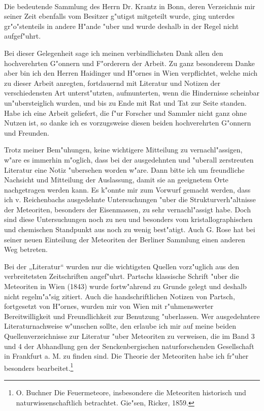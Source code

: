 \documentclass[a4paper, 11pt, oneside]{article}
\begin{document}
\paragraph{}
Die bedeutende Sammlung des Herrn Dr. Krantz in Bonn, deren Verzeichnis mir seiner Zeit ebenfalls vom Besitzer g"utigst mitgeteilt wurde, ging unterdes gr"o"stenteils in andere H"ande "uber und wurde deshalb in der Regel nicht aufgef"uhrt.

Bei dieser Gelegenheit sage ich meinen verbindlichsten Dank allen den hochverehrten G"onnern und F"orderern der Arbeit. Zu ganz besonderem Danke aber bin ich den Herren Haidinger und H"ornes in Wien verpflichtet, welche mich zu dieser Arbeit anregten, fortdauernd mit Literatur und Notizen der verschiedensten Art unterst"utzten, aufmunterten, wenn die Hindernisse scheinbar un"ubersteiglich wurden, und bis zu Ende mit Rat und Tat zur Seite standen. Habe ich eine Arbeit geliefert, die f"ur Forscher und Sammler nicht ganz ohne Nutzen ist, so danke ich es vorzugsweise diesen beiden hochverehrten G"onnern und Freunden.

Trotz meiner Bem"uhungen, keine wichtigere Mitteilung zu vernachl"assigen, w"are es immerhin m"oglich, dass bei der ausgedehnten und "uberall zerstreuten Literatur eine Notiz "ubersehen worden w"are. Dann bitte ich um freundliche Nachsicht und Mitteilung der Auslassung, damit sie an geeignetem Orte nachgetragen werden kann. Es k"onnte mir zum Vorwurf gemacht werden, dass ich v. Reichenbachs ausgedehnte Untersuchungen "uber die Strukturverh"altnisse der Meteoriten, besonders der Eisenmassen, zu sehr vernachl"assigt habe. Doch sind diese Untersuchungen noch zu neu und besonders vom kristallographischen und chemischen Standpunkt aus noch zu wenig best"atigt. Auch G. Rose hat bei seiner neuen Einteilung der Meteoriten der Berliner Sammlung einen anderen Weg betreten.

Bei der „Literatur“ wurden nur die wichtigsten Quellen vorz"uglich aus den verbreitetsten Zeitschriften angef"uhrt. Partschs klassische Schrift "uber die Meteoriten in Wien (1843) wurde fortw"ahrend zu Grunde gelegt und deshalb nicht regelm"a"sig zitiert. Auch die handschriftlichen Notizen von Partsch, fortgesetzt von H"ornes, wurden mir von Wien mit r"uhmenswerter Bereitwilligkeit und Freundlichkeit zur Benutzung "uberlassen. Wer ausgedehntere Literaturnachweise w"unschen sollte, den erlaube ich mir auf meine beiden Quellenverzeichnisse zur Literatur "uber Meteoriten zu verweisen, die im Band 3 und 4 der Abhandlung gen der Senckenbergischen naturforschenden Gesellschaft in Frankfurt a. M. zu finden sind. Die Theorie der Meteoriten habe ich fr"uher besonders bearbeitet.\footnote{O. Buchner Die Feuermeteore, insbesondere die Meteoriten historisch und naturwissenschaftlich betrachtet. Gie"sen, Ricker, 1859.}
\end{document}
